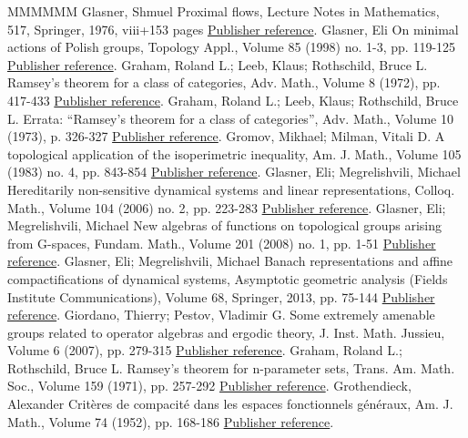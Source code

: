 \documentclass[11pt]{article}
\theoremstyle{definition}
\numberwithin{equation}{section}
\numberwithin{figure}{section}
\numberwithin{table}{section}
\begin{document}
\begin{thebibliography}{MMMMMM}
 Glasner, Shmuel Proximal flows, Lecture Notes in Mathematics, 517, Springer, 1976, viii+153 pages \href{https://ahl.centre-mersenne.org/item/AHL_2019__2__149_0/#Gl}{Publisher reference}.
 Glasner, Eli On minimal actions of Polish groups, Topology Appl., Volume 85 (1998) no. 1-3, pp. 119-125 \href{https://ahl.centre-mersenne.org/item/AHL_2019__2__149_0/#Gl1}{Publisher reference}.
 Graham, Roland L.; Leeb, Klaus; Rothschild, Bruce L. Ramsey’s theorem for a class of categories, Adv. Math., Volume 8 (1972), pp. 417-433 \href{https://ahl.centre-mersenne.org/item/AHL_2019__2__149_0/#GLR1}{Publisher reference}.
 Graham, Roland L.; Leeb, Klaus; Rothschild, Bruce L. Errata: “Ramsey’s theorem for a class of categories”, Adv. Math., Volume 10 (1973), p. 326-327 \href{https://ahl.centre-mersenne.org/item/AHL_2019__2__149_0/#GLR2}{Publisher reference}.
 Gromov, Mikhael; Milman, Vitali D. A topological application of the isoperimetric inequality, Am. J. Math., Volume 105 (1983) no. 4, pp. 843-854 \href{https://ahl.centre-mersenne.org/item/AHL_2019__2__149_0/#GM}{Publisher reference}.
 Glasner, Eli; Megrelishvili, Michael Hereditarily non-sensitive dynamical systems and linear representations, Colloq. Math., Volume 104 (2006) no. 2, pp. 223-283 \href{https://ahl.centre-mersenne.org/item/AHL_2019__2__149_0/#GlM1}{Publisher reference}.
 Glasner, Eli; Megrelishvili, Michael New algebras of functions on topological groups arising from G-spaces, Fundam. Math., Volume 201 (2008) no. 1, pp. 1-51 \href{https://ahl.centre-mersenne.org/item/AHL_2019__2__149_0/#GlM2}{Publisher reference}.
 Glasner, Eli; Megrelishvili, Michael Banach representations and affine compactifications of dynamical systems, Asymptotic geometric analysis (Fields Institute Communications), Volume 68, Springer, 2013, pp. 75-144 \href{https://ahl.centre-mersenne.org/item/AHL_2019__2__149_0/#GlM3}{Publisher reference}.
 Giordano, Thierry; Pestov, Vladimir G. Some extremely amenable groups related to operator algebras and ergodic theory, J. Inst. Math. Jussieu, Volume 6 (2007), pp. 279-315 \href{https://ahl.centre-mersenne.org/item/AHL_2019__2__149_0/#GP}{Publisher reference}.
 Graham, Roland L.; Rothschild, Bruce L. Ramsey’s theorem for n-parameter sets, Trans. Am. Math. Soc., Volume 159 (1971), pp. 257-292 \href{https://ahl.centre-mersenne.org/item/AHL_2019__2__149_0/#GR}{Publisher reference}.
 Grothendieck, Alexander Critères de compacité dans les espaces fonctionnels généraux, Am. J. Math., Volume 74 (1952), pp. 168-186 \href{https://ahl.centre-mersenne.org/item/AHL_2019__2__149_0/#Grothendieck}{Publisher reference}.

\end{thebibliography}
\end{document}
